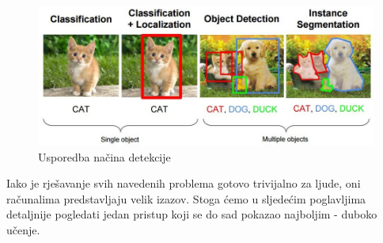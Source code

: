 \begin{figure}[htb]
\centering
\includegraphics[width=14cm]{slike/object_detection.jpeg}
\caption{Usporedba načina detekcije \citep{objectDetectionMethodsImg}}
\label{fig:fer-logo}
\end{figure}
\textbf{}

\noindent Iako je rješavanje svih navedenih problema gotovo trivijalno za ljude, oni računalima predstavljaju velik izazov. Stoga ćemo u sljedećim poglavljima detaljnije pogledati jedan pristup koji se do sad pokazao najboljim - duboko učenje.
